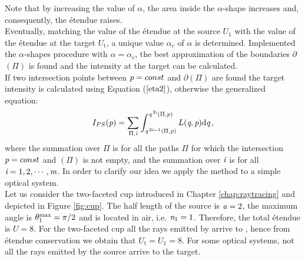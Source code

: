    Note that by increasing the value of $\alpha$, the area inside the $\alpha$-shape increases and, consequently, the \'{e}tendue raises.
\\ \indent Eventually, matching the value of the \'{e}tendue at the source $U_1$ with the value of the \'{e}tendue at the target $U_{\textrm{t}}$, a unique value $\alpha_{c}$ of $\alpha$  is determined. Implemented the $\alpha$-shapes procedure with $\alpha = \alpha_c$, the best approximation of the boundaries $\partial$$(\Pi)$ is found and the intensity at the target can be calculated.\\ \indent If two intersection points between $\textit{p}=const$ and $\partial$$(\Pi)$ are found the target intensity is calculated using Equation ($\ref{eta2}$), otherwise the generalized equation:
\begin{equation}
I_{PS}(\textit{p}) = \sum_{\Pi, \textit{i} }\int_{\textit{q}^{\,2\textit{i}-1}(\Pi, \textit{p})}^{\textit{q}^{\,2\textit{i}}( \Pi, \textit{p})}L(\textit{q}, \textit{p})\textrm{d}\textit{q}\,,
\label{eq:Ips}
\end{equation}
where the summation over $\Pi$ is for all the paths $\Pi$ for which the intersection $\textit{p} = const$ and $(\Pi)$ is not empty, and the summation over $\textit{i}$ is for all $\textit{i} = 1,2, \cdots, \textit{m}$.
In order to clarify our idea we apply the method to a simple optical system.
\\ \indent Let us consider the two-faceted cup introduced in Chapter \ref{chap:raytracing} and depicted in Figure \ref{fig:cup}. The half length of the source is $\textit{a}=2$, the maximum angle is $\theta_1^{\textrm{max}} = \pi/2$ and  is located in air, i.e. $\textit{n}_1=1$. Therefore, the total \'{e}tendue is $U=8$. For the two-faceted cup all the rays emitted by  arrive to , hence from \'{e}tendue conservation we obtain that $U_{\textrm{t}} =U_1 = 8$.
For some optical systems, not all the rays emitted by the source arrive to the target.  

